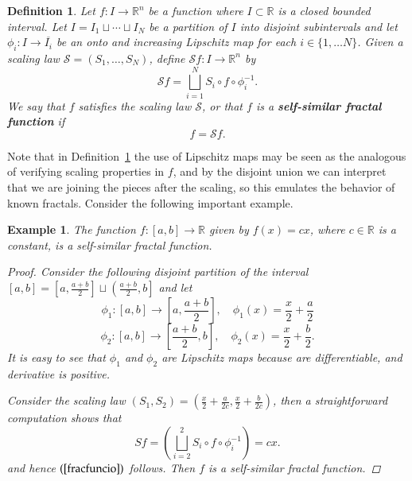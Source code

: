 \documentclass{amsart}
\newtheorem{definition}[theorem]{Definition}
\newtheorem{example}[theorem]{Example}
\newcommand{\R}{{\mathbb{R}}}
\begin{document}
\begin{definition}\label{selfsim}
Let $f:I\rightarrow \R^n$ be a function where $I\subset \R$ is a closed bounded interval. Let $I=I_1\sqcup \cdots\sqcup I_N$ be a partition of $I$ into disjoint subintervals and let $\phi_i:I\rightarrow \overline{I_i}$ be an onto and increasing Lipschitz map for each $i\in \{1,\dots N\}$.
Given a scaling law $\mathcal{S}=(S_1,\dots ,S_N)$, define $\mathcal{S}f:I\rightarrow \R^n$ by
\begin{equation*}
    \mathcal{S}f= \bigsqcup_{i=1}^{N}S_i\circ f\circ \phi_i^{-1}.
\end{equation*}
We say that $f$ satisfies the scaling law $\mathcal{S}$, or that $f$ is a \textbf{self-similar fractal function} if
\begin{equation}\label{fracfuncio}
    f=\mathcal{S}f.
\end{equation}
\end{definition}
Note that in Definition~\ref{selfsim} the use of Lipschitz maps may be seen as  the analogous of verifying scaling properties in $f$, and by the disjoint union we can interpret that we are joining the pieces after the scaling, so this emulates the behavior of known fractals. Consider the following important example. 
\begin{example}\label{rec}
The function $f:[a,b]\rightarrow \R$ given by $f(x)=cx$, where $c\in \R$ is a constant, is a self-similar fractal function.
\begin{proof}
Consider the following disjoint partition of the interval $[a,b]=\left[a,\frac{a+b}{2}\right] \sqcup \left(\frac{a+b}{2},b\right]$ and let
\begin{equation*}
     \phi_1:[a,b]\rightarrow \left[a,\frac{a+b}{2}\right],\quad  \phi_1(x)=\frac{x}{2}+\frac{a}{2}
\end{equation*}
\begin{equation*}
     \phi_2:[a,b]\rightarrow \left[\frac{a+b}{2},b\right],\quad  \phi_2(x)=\frac{x}{2}+\frac{b}{2}.
\end{equation*}
It is  easy to see that $\phi_1$ and $\phi_2$ are  Lipschitz maps because are differentiable, and  derivative is positive.

Consider the scaling law $(S_1,S_2)=\left (\frac{x}{2}+\frac{a}{2c},\frac{x}{2}+\frac{b}{2c}\right)$, then a straightforward computation shows that
 \begin{equation*}
      Sf=\left(\bigsqcup^{2}_{i=2} S_i\circ f\circ \phi^{-1}_i\right)=cx.
 \end{equation*}
 and hence   $(\ref{fracfuncio})$ follows. Then $f$ is a self-similar fractal function.
\end{proof}
\end{example}
\end{document}
